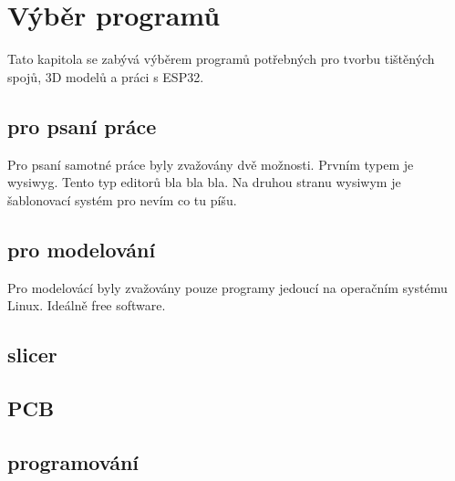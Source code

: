 \section{Výběr programů}

Tato kapitola se zabývá výběrem programů potřebných pro tvorbu tištěných spojů, 3D modelů a práci s ESP32.

\subsection{pro psaní práce}

Pro psaní samotné práce byly zvažovány dvě možnosti.
Prvním typem je \ac{wysiwyg}. Tento typ editorů bla bla bla.
Na druhou stranu \ac{wysiwym} je šablonovací systém pro nevím co tu píšu. 

\subsection{pro modelování}

Pro modelovácí byly zvažovány pouze programy jedoucí na operačním systému Linux. Ideálně free software.

\subsection{slicer}

\subsection{PCB}

\subsection{programování}